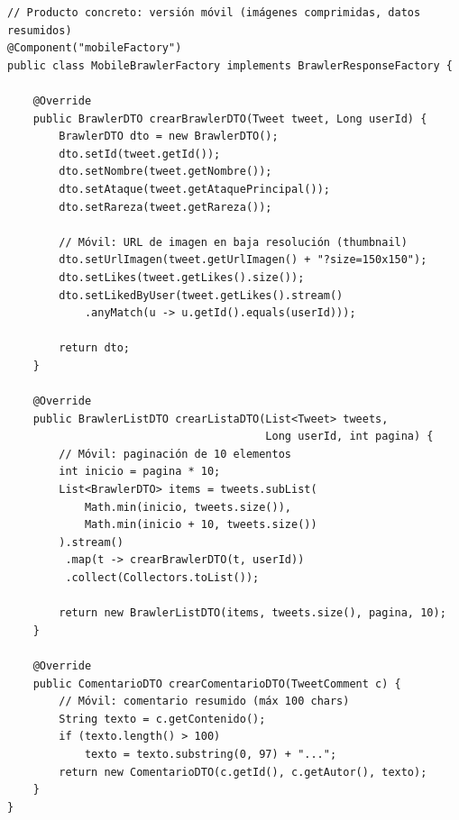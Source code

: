 \documentclass[12pt,a4paper]{article}
\begin{document}
\begin{lstlisting}[caption={MobileBrawlerFactory.java -- Factory concreta para m\'ovil}]
// Producto concreto: versión móvil (imágenes comprimidas, datos resumidos)
@Component("mobileFactory")
public class MobileBrawlerFactory implements BrawlerResponseFactory {

    @Override
    public BrawlerDTO crearBrawlerDTO(Tweet tweet, Long userId) {
        BrawlerDTO dto = new BrawlerDTO();
        dto.setId(tweet.getId());
        dto.setNombre(tweet.getNombre());
        dto.setAtaque(tweet.getAtaquePrincipal());
        dto.setRareza(tweet.getRareza());

        // Móvil: URL de imagen en baja resolución (thumbnail)
        dto.setUrlImagen(tweet.getUrlImagen() + "?size=150x150");
        dto.setLikes(tweet.getLikes().size());
        dto.setLikedByUser(tweet.getLikes().stream()
            .anyMatch(u -> u.getId().equals(userId)));

        return dto;
    }

    @Override
    public BrawlerListDTO crearListaDTO(List<Tweet> tweets,
                                        Long userId, int pagina) {
        // Móvil: paginación de 10 elementos
        int inicio = pagina * 10;
        List<BrawlerDTO> items = tweets.subList(
            Math.min(inicio, tweets.size()),
            Math.min(inicio + 10, tweets.size())
        ).stream()
         .map(t -> crearBrawlerDTO(t, userId))
         .collect(Collectors.toList());

        return new BrawlerListDTO(items, tweets.size(), pagina, 10);
    }

    @Override
    public ComentarioDTO crearComentarioDTO(TweetComment c) {
        // Móvil: comentario resumido (máx 100 chars)
        String texto = c.getContenido();
        if (texto.length() > 100)
            texto = texto.substring(0, 97) + "...";
        return new ComentarioDTO(c.getId(), c.getAutor(), texto);
    }
}
\end{lstlisting}
\end{document}
